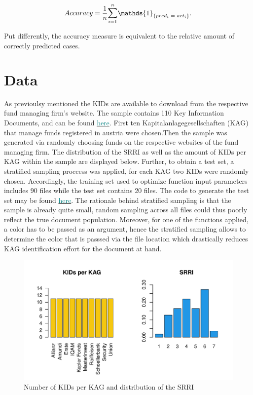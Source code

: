 \documentclass[aodsor,preprint]{imsart}
\numberwithin{equation}{section}
\theoremstyle{plain}
\begin{document}
\[
Accuracy = \frac{1}{n}\mathlarger{\sum}_{i = 1}^n\mathds{1}_{\{pred_i \text{ }= \text{ } act_i\}}\text{.}
\]

Put differently, the accuracy measure is equivalent to the relative amount of correctly predicted cases.
\newpage

\section{Data}
As previoulsy mentioned the KIDs are available to download from the respective fund managing firm's website. The  sample contains 110 Key Information Documents, and can be found \href{https://github.com/Base-R-Best-R/KID/tree/main/KIDs}{\textcolor{teal}{here}}. First ten Kapitalanlagegesellschaften (KAG) that manage funds registered in austria were chosen.Then the sample was generated via randomly choosing funds on the respective websites of the fund managing firm. The distribution of the SRRI as well as the amount of KIDs per KAG within the sample are displayed below. Further, to obtain a test set, a stratified sampling proccess was applied, for each KAG two KIDs were randomly chosen. Accordingly, the training set used to optimize function input parameters includes 90 files while the test set contains 20 files. The code to generate the test set may be found \href{https://github.com/Base-R-Best-R/KID/blob/main/Code/Package/DEV/Generate_Test_Sample.R}{\textcolor{teal}{here}}. The rationale behind stratified sampling is that the sample is already quite small, random sampling across all files could thus poorly reflect the true document population. Moreover, for one of the functions applied, a color has to be passed as an argument, hence the stratified sampling allows to determine the color that is passsed via the file location which drastically reduces KAG identification effort for the document at hand. 

\begin{figure}[H]
	\includegraphics[width = 12cm]{data_overview.pdf}
	\caption{Number of KIDs per KAG and distribution of the SRRI}
\end{figure}
\end{document}
